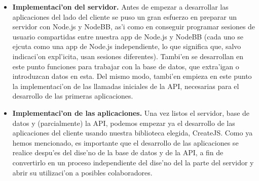 \begin{itemize}
\item \textbf{Implementaci'on del servidor.} Antes de empezar a desarrollar las aplicaciones del lado del cliente se
puso un gran esfuerzo en preparar un servidor con Node.js y NodeBB, as'i como en conseguir programar sesiones de
usuario compartidas entre nuestra app de Node.js y NodeBB (cada uno se ejcuta como una app de Node.js independiente,
lo que significa que, salvo indicaci'on expl'icita, usan sesiones diferentes).
Tambi'en se desarrollan en este punto funciones para trabajar con la base de datos, que extra'igan o introduzcan
datos en esta.
Del mismo modo, tambi'en empieza en este punto la implementaci'on de las llamadas iniciales de la API, necesarias
para el desarrollo de las primeras aplicaciones.
\item \textbf{Implementaci'on de las aplicaciones.} Una vez listos el servidor, base de datos y (parcialmente) la
API, podemos empezar ya el desarrollo de las aplicaciones del cliente usando nuestra biblioteca elegida, CreateJS.
Como ya hemos mencionado, es importante que el desarrollo de las aplicaciones se realice despu'es del dise'no de la
base de datos y de la API, a fin de convertirlo en un proceso independiente del dise'no del la parte del servidor y
abrir su utilizaci'on a posibles colaboradores.
\end{itemize}
